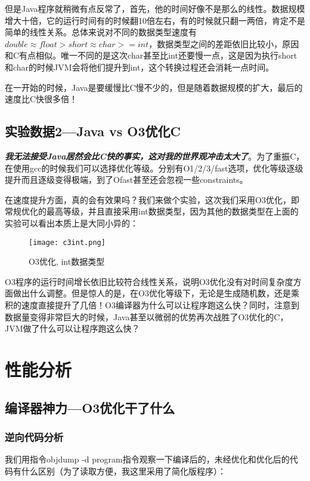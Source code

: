 \documentclass[11pt]{article}
\begin{document}
但是Java程序就稍微有点反常了，首先，他的时间好像不是那么的线性。数据规模增大十倍，它的运行时间有的时候翻10倍左右，有的时候就只翻一两倍，肯定不是简单的线性关系。总体来说对不同的数据类型速度有$double \approx float > short \approx char >= int$，数据类型之间的差距依旧比较小，原因和C有点相似。唯一不同的是这次char甚至比int还要慢一点，这是因为执行short和char的时候JVM会将他们提升到int，这个转换过程还会消耗一点时间。


在一开始的时候，Java是要缓慢比C慢不少的，但是随着数据规模的扩大，最后的速度比C快很多倍！

\subsection{实验数据2—Java vs O3优化C}
\textbf{\textit{我无法接受Java居然会比C快的事实，这对我的世界观冲击太大了}}。为了重振C，在使用gcc的时候我们可以选择优化等级。分别有O1/2/3/fast选项，优化等级逐级提升而且逐级变得极端，到了Ofast甚至还会忽视一些constraints。


在速度提升方面，真的会有效果吗？我们来做个实验，这次我们采用O3优化，即常规优化的最高等级，并且直接采用int数据类型，因为其他的数据类型在上面的实验可以看出本质上是大同小异的：

\begin{figure}[H]
  \centering
  \texttt{[image: c3int.png]}
  \caption{O3优化, int数据类型}
  \label{fig:example}
\end{figure}
O3程序的运行时间增长依旧比较符合线性关系，说明O3优化没有对时间复杂度方面做出什么调整。但是惊人的是，在O3优化等级下，无论是生成随机数，还是乘积的速度直接提升了几倍！O3编译器为什么可以让程序跑这么快？同时，注意到数据量变得非常巨大的时候，Java甚至以微弱的优势再次战胜了O3优化的C，JVM做了什么可以让程序跑这么快？

\section{性能分析}
\subsection{编译器神力—O3优化干了什么}
\subsubsection{逆向代码分析}
我们用指令objdump -d program指令观察一下编译后的，未经优化和优化后的代码有什么区别（为了读取方便，我这里采用了简化版程序）：
\end{document}
